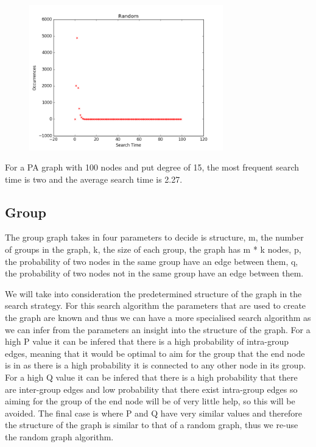 \documentclass[paper=a4, fontsize=11pt]{scrartcl}
\numberwithin{equation}{section}		%
\numberwithin{figure}{section}			%
\numberwithin{table}{section}				%
\begin{document}
\begin{figure}[h]
\center
\caption{}
\includegraphics[width=0.75\textwidth]{pictures/paSearch.png}
\end{figure}

For a PA graph with 100 nodes and put degree of 15, the most frequent search time is two and the average search time is 2.27.

\subsection*{Group}

The group graph takes in four parameters to decide is structure, m, the number of groups in the graph, k, the size of each group, the graph has m * k nodes, p, the probability of two nodes in the same group have an edge between them, q, the probability of two nodes not in the same group have an edge between them.

We will take into consideration the predetermined structure of the graph in the search strategy. For this search algorithm the parameters that are used to create the graph are known and thus we can have a more specialised search algorithm as we can infer from the parameters an insight into the structure of the graph. For a high P value it can be infered that there is a high probability of intra-group edges, meaning that it would be optimal to aim for the group that the end node is in as there is a high probability it is connected to any other node in its group. For a high Q value it can be infered that there is a high probability that there are inter-group edges and low probability that there exist intra-group edges so aiming for the group of the end node will be of very little help, so this will be avoided. The final case is where P and Q have very similar values and therefore the structure of the graph is similar to that of a random graph, thus we re-use the random graph algorithm.\\
\end{document}
